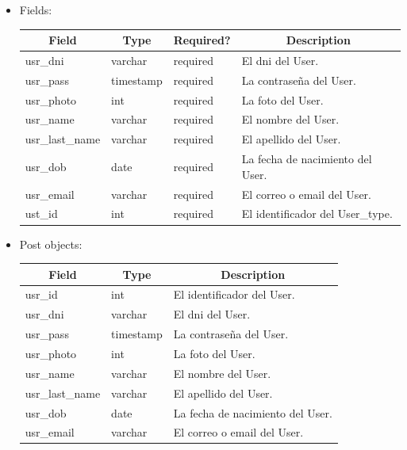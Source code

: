 \documentclass{article}
\begin{document}
\begin{enumerate}
\begin{itemize}
        \item Fields: \begin{table}[H] \centering \begin{tabular}{|l|l|l|l|} \hline
        \multicolumn{1}{|c|}{\textbf{Field}} &
        \multicolumn{1}{c|}{\textbf{Type}} &
        \multicolumn{1}{c|}{\textbf{Required?}} &
        \multicolumn{1}{c|}{\textbf{Description}} \\ \hline usr\_dni & varchar &
        required & El dni del User. \\ \hline usr\_pass & timestamp & required &
        La contraseña del User. \\ \hline usr\_photo & int & required & La foto
        del User. \\ \hline usr\_name & varchar & required & El nombre del User.
        \\ \hline usr\_last\_name & varchar & required & El apellido del User.
        \\ \hline usr\_dob & date & required & La fecha de nacimiento del User.
        \\ \hline usr\_email & varchar & required & El correo o email del User.
        \\ \hline ust\_id & int & required & El identificador del User\_type. \\
        \hline \end{tabular} \end{table} \item Post objects: \begin{table}[H] \centering
        \begin{tabular}{|l|l|l|} \hline \multicolumn{1}{|c|}{\textbf{Field}} &
        \multicolumn{1}{c|}{\textbf{Type}} &
        \multicolumn{1}{c|}{\textbf{Description}} \\ \hline usr\_id & int & El
        identificador del User. \\ \hline usr\_dni & varchar & El dni del User.
        \\ \hline usr\_pass & timestamp & La contraseña del User. \\ \hline
        usr\_photo & int & La foto del User. \\ \hline usr\_name & varchar & El
        nombre del User. \\ \hline usr\_last\_name & varchar & El apellido del
        User. \\ \hline usr\_dob & date & La fecha de nacimiento del User. \\
        \hline usr\_email & varchar & El correo o email del User. \\ \hline

\end{tabular}
\end{table}
\end{itemize}
\end{enumerate}
\end{document}
